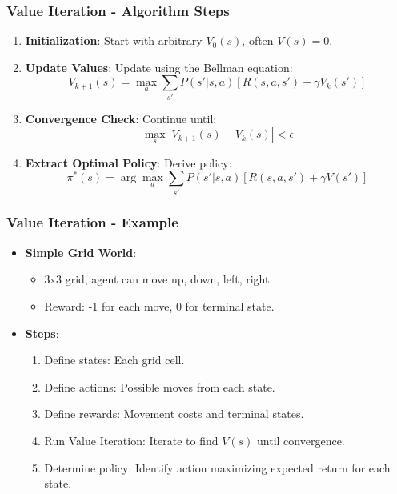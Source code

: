 \documentclass[aspectratio=169]{beamer}
\begin{document}
\begin{frame}[fragile]
    \frametitle{Value Iteration - Algorithm Steps}
    \begin{enumerate}
        \item \textbf{Initialization}: Start with arbitrary \(V_0(s)\), often \(V(s) = 0\).
        \item \textbf{Update Values}: Update using the Bellman equation:
        \begin{equation}
            V_{k+1}(s) = \max_a \sum_{s'} P(s'|s,a) \left[ R(s, a, s') + \gamma V_k(s') \right]
        \end{equation}
        \item \textbf{Convergence Check}: Continue until:
        \begin{equation}
            \max_s |V_{k+1}(s) - V_k(s)| < \epsilon
        \end{equation}
        \item \textbf{Extract Optimal Policy}: Derive policy:
        \begin{equation}
            \pi^*(s) = \arg\max_a \sum_{s'} P(s'|s,a) \left[ R(s, a, s') + \gamma V(s') \right]
        \end{equation}
    \end{enumerate}
\end{frame}

\begin{frame}[fragile]
    \frametitle{Value Iteration - Example}
    \begin{itemize}
        \item \textbf{Simple Grid World}:
        \begin{itemize}
            \item 3x3 grid, agent can move up, down, left, right.
            \item Reward: -1 for each move, 0 for terminal state.
        \end{itemize}
        \item \textbf{Steps}:
        \begin{enumerate}
            \item Define states: Each grid cell.
            \item Define actions: Possible moves from each state.
            \item Define rewards: Movement costs and terminal states.
            \item Run Value Iteration: Iterate to find \(V(s)\) until convergence.
            \item Determine policy: Identify action maximizing expected return for each state.
        \end{enumerate}
    \end{itemize}
\end{frame}
\end{document}
